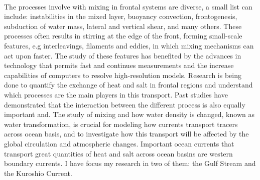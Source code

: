 \documentclass[letterpaper, 12pt ]{article}
\begin{document}
    \paragraph{}
    The processes involve with mixing in frontal systems are diverse, a small list can include: instabilities in the mixed layer, buoyancy convection, frontogenesis, subduction of water mass, lateral and vertical shear, and many others. These processes often results in stirring at the edge of the front, forming small-scale features, e.g interleavings, filaments and eddies, in which mixing mechanisms can act upon faster. The study of these features has benefited by the advances in technology that permits fast and continues measurements and the increase capabilities of computers to resolve high-resolution models. Research is being done to quantify the exchange of heat and salt in frontal regions and understand which processes are the main players in this transport. Past studies have demonstrated that the interaction between the different process is also equally important and.  The study of mixing and how water density is changed, known as water transformation, is crucial for modeling how currents transport tracers across ocean basis, and to investigate how this transport will be affected by the global circulation and atmospheric changes. Important ocean currents that transport great quantities of heat and salt across ocean basins are western boundary currents. I have focus my research in two of them: the Gulf Stream and the Kuroshio Current.
    
    
\end{document}

